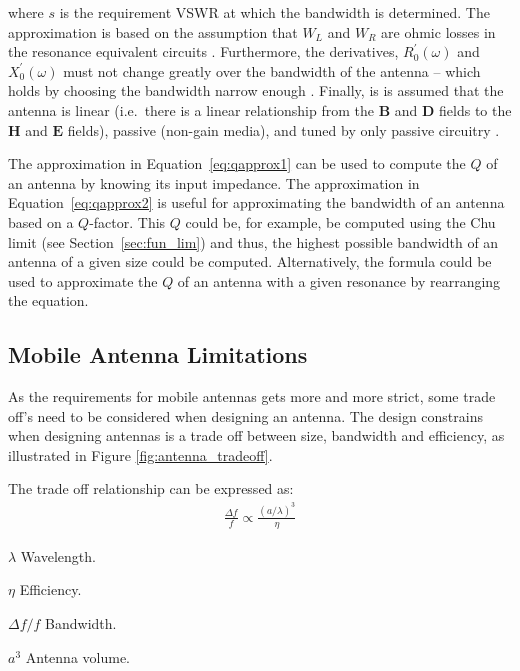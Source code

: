 where $s$ is the requirement VSWR at which the bandwidth is determined. The approximation is based on the assumption that $W_L$ and $W_R$ are ohmic losses in the resonance equivalent circuits \cite{yaghjian2005impedance}. Furthermore, the derivatives, $R^{\prime}_0(\omega)$ and $X^{\prime}_0(\omega)$ must not change greatly over the bandwidth of the antenna -- which holds by choosing the bandwidth narrow enough \cite{yaghjian2005impedance}.
Finally, is is assumed that the antenna is linear (i.e.\ there is a linear relationship from the $\mathbf{B}$ and $\mathbf{D}$ fields to the $\mathbf{H}$ and $\mathbf{E}$ fields), passive (non-gain media), and tuned by only passive circuitry \cite{yaghjian2005impedance}. 

The approximation in Equation~\ref{eq:qapprox1} can be used to compute the $Q$ of an antenna by knowing its input impedance.  
The approximation in Equation~\ref{eq:qapprox2} is useful for approximating the bandwidth of an antenna based on a $Q$-factor. This $Q$ could be, for example, be computed using the Chu limit (see Section~\ref{sec:fun_lim}) and thus, the highest possible bandwidth of an antenna of a given size could be computed. Alternatively, the formula could be used to approximate the $Q$ of an antenna with a given resonance by rearranging the equation.



\subsection{Mobile Antenna Limitations}
\label{subsec:ant_limit}
As the requirements for mobile antennas gets more and more strict, some trade off's need to be considered when designing an antenna.
The design constrains when designing antennas is a trade off between size, bandwidth and efficiency, as illustrated in Figure \ref{fig:antenna_tradeoff}. 

The trade off relationship can be expressed as\cite{hilbert2015tradeoff}: 
\begin{align*}
  \frac{\Delta f}{f} \propto \frac{(a/ \lambda)^3}{\eta}
\end{align*}

\begin{where}
\item [$\lambda$] Wavelength.
\item [$\eta$] Efficiency.
\item [$\Delta f / f$] Bandwidth.
\item [$a^3$] Antenna volume.
\end{where}


